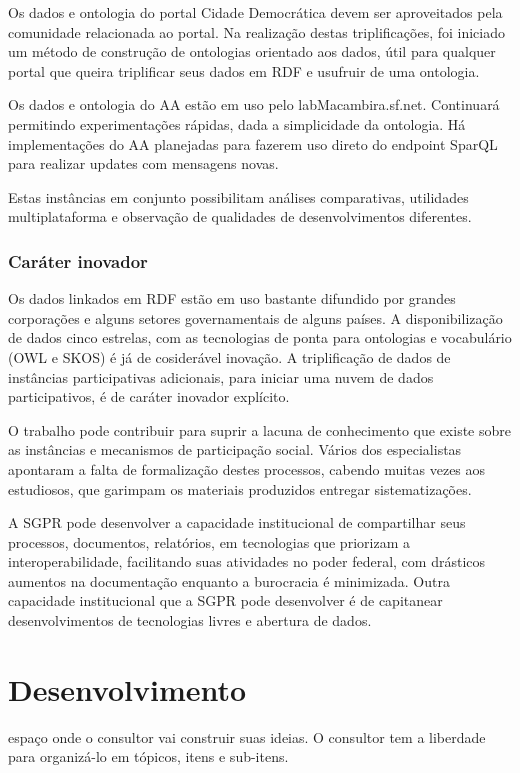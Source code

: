 \documentclass[12pt]{article}
\begin{document}
Os dados e ontologia do portal Cidade Democrática devem ser aproveitados pela comunidade relacionada ao portal. Na realização destas triplificações, foi iniciado um método de construção de ontologias orientado aos dados, útil para qualquer portal que queira triplificar seus dados em RDF e usufruir de uma ontologia.

Os dados e ontologia do AA estão em uso pelo labMacambira.sf.net. Continuará permitindo experimentações rápidas, dada a simplicidade da ontologia. Há implementações do AA planejadas para fazerem uso direto do endpoint SparQL para realizar updates com mensagens novas.

Estas instâncias em conjunto possibilitam análises comparativas, utilidades multiplataforma e observação de qualidades de desenvolvimentos diferentes.

\subsubsection{Caráter inovador}
Os dados linkados em RDF estão em uso bastante difundido por grandes corporações e alguns setores governamentais de alguns países. A disponibilização de dados cinco estrelas, com as tecnologias de ponta para ontologias e vocabulário (OWL e SKOS) é já de cosiderável inovação. A triplificação de dados de instâncias participativas adicionais, para iniciar uma nuvem de dados participativos, é de caráter inovador explícito.

O trabalho pode contribuir para suprir a lacuna de conhecimento que existe sobre as instâncias e mecanismos de participação social. Vários dos especialistas apontaram a falta de formalização destes processos, cabendo muitas vezes aos estudiosos, que garimpam os materiais produzidos entregar sistematizações.

A SGPR pode desenvolver a capacidade institucional de compartilhar seus processos, documentos, relatórios, em tecnologias que priorizam a interoperabilidade, facilitando suas atividades no poder federal, com drásticos aumentos na documentação enquanto a burocracia é minimizada.
Outra capacidade institucional que a SGPR pode desenvolver é de capitanear desenvolvimentos de tecnologias livres e abertura de dados.

\section{Desenvolvimento}\label{sec:dev}


espaço onde o consultor vai construir suas ideias. O consultor tem a liberdade para organizá-lo em tópicos, itens e sub-itens. 
\end{document}
